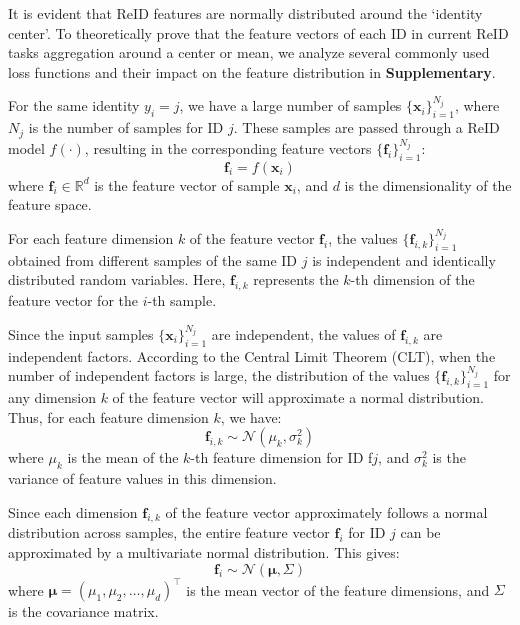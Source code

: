 It is evident that ReID features are normally distributed around the ‘identity center’. To theoretically prove that the feature vectors of each ID in current ReID tasks aggregation around a center or mean, we analyze several commonly used loss functions and their impact on the feature distribution in \textbf{Supplementary}.

For the same identity \( y_i = j \), we have a large number of samples \( \{\mathbf{x}_i\}_{i=1}^{N_j} \), where \( N_j \) is the number of samples for ID \( j \). These samples are passed through a ReID model \( f(\cdot) \), resulting in the corresponding feature vectors \( \{\mathbf{f}_i\}_{i=1}^{N_j} \):
\begin{equation}
\mathbf{f}_i = f(\mathbf{x}_i)
\end{equation}
where \( \mathbf{f}_i \in \mathbb{R}^d \) is the feature vector of sample \( \mathbf{x}_i \), and \( d \) is the dimensionality of the feature space.

For each feature dimension \( k \) of the feature vector \( \mathbf{f}_i \), the values \( \{\mathbf{f}_{i,k}\}_{i=1}^{N_j} \) obtained from different samples of the same ID \( j \) is independent and identically distributed random variables. Here, \( \mathbf{f}_{i,k} \) represents the \( k \)-th dimension of the feature vector for the \( i \)-th sample.

Since the input samples \( \{\mathbf{x}_i\}_{i=1}^{N_j} \) are independent, the values of \( \mathbf{f}_{i,k} \) are independent factors. According to the Central Limit Theorem (CLT), when the number of independent factors is large, the distribution of the values \( \{\mathbf{f}_{i,k}\}_{i=1}^{N_j} \) for any dimension \( k \) of the feature vector will approximate a normal distribution. Thus, for each feature dimension \( k \), we have:
\begin{equation}
\mathbf{f}_{i,k} \sim \mathcal{N}(\mu_k, \sigma_k^2)
\end{equation}
where \( \mu_k \) is the mean of the \( k \)-th feature dimension for ID f\( j \), and \( \sigma_k^2 \) is the variance of feature values in this dimension.

Since each dimension \( \mathbf{f}_{i,k} \) of the feature vector approximately follows a normal distribution across samples, the entire feature vector \( \mathbf{f}_i \) for ID \( j \) can be approximated by a multivariate normal distribution. This gives:
\begin{equation}
\mathbf{f}_i \sim \mathcal{N}(\boldsymbol{\mu}, \Sigma)
\end{equation}
where \( \boldsymbol{\mu} = (\mu_1, \mu_2, \dots, \mu_d)^\top \) is the mean vector of the feature dimensions, and \( \Sigma \) is the covariance matrix.

